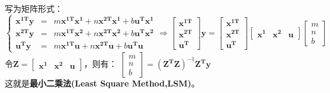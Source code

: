 \documentclass{article}
\begin{document}
\begin{CJK}{UTF8}{gbsn}
	写为矩阵形式：
	$$\left\{\begin{aligned}\boldsymbol{x^{1T}}\boldsymbol{y} &=& m\boldsymbol{x^{1T}}\boldsymbol{x^1}+n\boldsymbol{x^{2T}}\boldsymbol{x^1}+b\boldsymbol{u^T}\boldsymbol{x^1}\\
	\boldsymbol{x^{2T}}\boldsymbol{y} &=& m\boldsymbol{x^{1T}}\boldsymbol{x^2}+n\boldsymbol{x^{2T}}\boldsymbol{x^2}+b\boldsymbol{u^T}\boldsymbol{x^2}\\
	\boldsymbol{u^T}\boldsymbol{y} &=& m\boldsymbol{x^{1T}}\boldsymbol{u}+n\boldsymbol{x^{2T}}\boldsymbol{u}+b\boldsymbol{u^T}\boldsymbol{u}\end{aligned}\right.
	\Rightarrow
	\left [\begin{array}{cccc}\boldsymbol{x^{1T}}\\\boldsymbol{x^{2T}}\\\boldsymbol{u^T}\end{array}\right ]\boldsymbol{y}=
	\left [\begin{array}{cccc}\boldsymbol{x^{1T}}\\\boldsymbol{x^{2T}}\\\boldsymbol{u^T}\end{array}\right ]
	\left [\begin{array}{cccc}\boldsymbol{x^1}&\boldsymbol{x^2}&\boldsymbol{u}\end{array}\right ]
	\left [\begin{array}{cccc}m\\n\\b\end{array}\right ]$$
	令$\boldsymbol{Z}=\left [\begin{array}{cccc}\boldsymbol{x^1}&\boldsymbol{x^2}&\boldsymbol{u}\end{array}\right ]$，则有：
	$\left [\begin{array}{cccc}m\\n\\b\end{array}\right ]=(\boldsymbol{Z^T}\boldsymbol{Z})^{-1}\boldsymbol{Z^T}\boldsymbol{y}$\\
	这就是\textbf{最小二乘法(Least Square Method,LSM)}。\\

	

\end{CJK}
\end{document}
